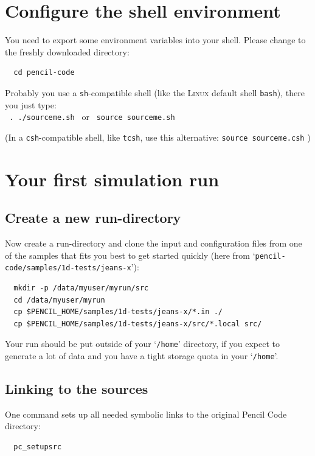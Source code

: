 \documentclass[a4paper,12pt]{article}
\newcommand{\command}[1]{\texttt{#1}}
\newcommand{\directory}[1]{`\texttt{#1}'}
\newcommand{\name}[1]{\textsc{#1}}
\begin{document}
\section{Configure the shell environment}

You need to export some environment variables into your shell.
Please change to the freshly downloaded directory:
\begin{verbatim}
  cd pencil-code
\end{verbatim}

Probably you use a \command{sh}-compatible shell (like the \name{Linux} default shell \command{bash}), there you just type:\\[2mm]
\command{ . ./sourceme.sh  }  or  \command{  source sourceme.sh}

(In a \command{csh}-compatible shell, like \command{tcsh}, use this alternative: \command{source sourceme.csh} )


\section{Your first simulation run}

\subsection{Create a new run-directory}

Now create a run-directory and clone the input and configuration files from one of the samples that fits you best to get started quickly (here from \directory{pencil-code/samples/1d-tests/jeans-x}):
\begin{verbatim}
  mkdir -p /data/myuser/myrun/src
  cd /data/myuser/myrun
  cp $PENCIL_HOME/samples/1d-tests/jeans-x/*.in ./
  cp $PENCIL_HOME/samples/1d-tests/jeans-x/src/*.local src/
\end{verbatim}
Your run should be put outside of your \directory{/home} directory, if you expect to generate a lot of data and you have a tight storage quota in your \directory{/home}.

\subsection{Linking to the sources}

One command sets up all needed symbolic links to the original Pencil Code directory:
\begin{verbatim}
  pc_setupsrc
\end{verbatim}
\end{document}
